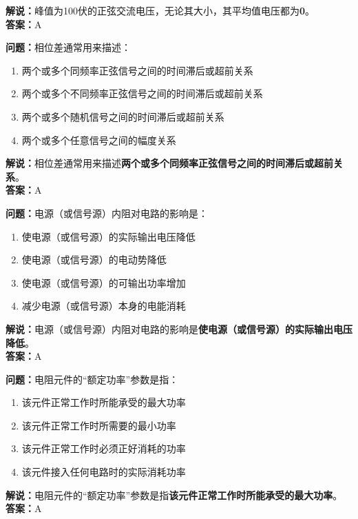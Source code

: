 \textbf{解说：}峰值为100伏的正弦交流电压，无论其大小，其平均值电压都为\textbf{0}。\\\textbf{答案：}A



\textbf{问题：}相位差通常用来描述：

\begin{enumerate}[label=\Alph*), leftmargin=1cm]
	\item 两个或多个同频率正弦信号之间的时间滞后或超前关系
	\item 两个或多个不同频率正弦信号之间的时间滞后或超前关系
	\item 两个或多个随机信号之间的时间滞后或超前关系
	\item 两个或多个任意信号之间的幅度关系
\end{enumerate}

\textbf{解说：}相位差通常用来描述\textbf{两个或多个同频率正弦信号之间的时间滞后或超前关系}。\\\textbf{答案：}A



\textbf{问题：}电源（或信号源）内阻对电路的影响是：

\begin{enumerate}[label=\Alph*), leftmargin=1cm]
	\item 使电源（或信号源）的实际输出电压降低
	\item 使电源（或信号源）的电动势降低
	\item 使电源（或信号源）的可输出功率增加
	\item 减少电源（或信号源）本身的电能消耗
\end{enumerate}

\textbf{解说：}电源（或信号源）内阻对电路的影响是\textbf{使电源（或信号源）的实际输出电压降低}。\\\textbf{答案：}A



\textbf{问题：}电阻元件的“额定功率”参数是指：

\begin{enumerate}[label=\Alph*), leftmargin=1cm]
	\item 该元件正常工作时所能承受的最大功率
	\item 该元件正常工作时所需要的最小功率
	\item 该元件正常工作时必须正好消耗的功率
	\item 该元件接入任何电路时的实际消耗功率
\end{enumerate}

\textbf{解说：}电阻元件的“额定功率”参数是指\textbf{该元件正常工作时所能承受的最大功率}。\\\textbf{答案：}A



